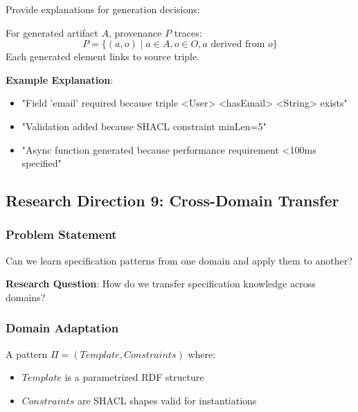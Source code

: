 Provide explanations for generation decisions:

\begin{definition}
    For generated artifact $A$, provenance $P$ traces:
    \begin{equation}
        P = \{(a, o) \mid a \in A, o \in O, a \text{ derived from } o\}
    \end{equation}
    Each generated element links to source triple.
\end{definition}

\textbf{Example Explanation}:
\begin{itemize}
    \item "Field 'email' required because triple <User> <hasEmail> <String> exists"
    \item "Validation added because SHACL constraint minLen=5"
    \item "Async function generated because performance requirement <100ms specified"
\end{itemize}

\subsection{Research Direction 9: Cross-Domain Transfer}

\subsubsection{Problem Statement}

Can we learn specification patterns from one domain and apply them to another?

\textbf{Research Question}: How do we transfer specification knowledge across domains?

\subsubsection{Domain Adaptation}

\begin{definition}
    A pattern $\Pi = (Template, Constraints)$ where:
    \begin{itemize}
        \item $Template$ is a parametrized RDF structure
        \item $Constraints$ are SHACL shapes valid for instantiations
    \end{itemize}
\end{definition}


